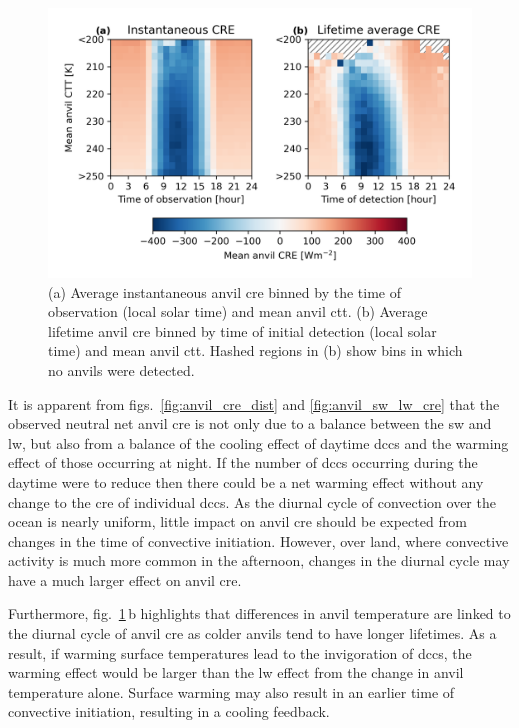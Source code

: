 \begin{figure}[tp]
    \includegraphics[width=\textwidth]{figures/chapter4_16.png}
    \caption[
    Average anvil \acrshort{cre} binned by the time of detection (local time) and mean anvil \acrshort{ctt}
    ]{
    (a) Average instantaneous anvil \acrshort{cre} binned by the time of observation (local solar time) and mean anvil \acrshort{ctt}. (b) Average lifetime anvil \acrshort{cre} binned by time of initial detection (local solar time) and mean anvil \acrshort{ctt}. Hashed regions in (b) show bins in which no anvils were detected.
    }
    \label{fig:anvil_cre_time_vs_ctt}
\end{figure}


It is apparent from figs.~\ref{fig:anvil_cre_dist} and \ref{fig:anvil_sw_lw_cre} that the observed neutral net anvil \acrshort{cre} is not only due to a balance between the \acrshort{sw} and \acrshort{lw}, but also from a balance of the cooling effect of daytime \acrshort{dcc}s and the warming effect of those occurring at night. 
If the number of \acrshort{dcc}s occurring during the daytime were to reduce then there could be a net warming effect without any change to the \acrshort{cre} of individual \acrshort{dcc}s.
As the diurnal cycle of convection over the ocean is nearly uniform, little impact on anvil \acrshort{cre} should be expected from changes in the time of convective initiation.
However, over land, where convective activity is much more common in the afternoon, changes in the diurnal cycle may have a much larger effect on anvil \acrshort{cre}.

Furthermore, fig.~\ref{fig:anvil_cre_time_vs_ctt}\,b highlights that differences in anvil temperature are linked to the diurnal cycle of anvil \acrshort{cre} as colder anvils tend to have longer lifetimes.
As a result, if warming surface temperatures lead to the invigoration of \acrshort{dcc}s, the warming effect would be larger than the \acrshort{lw} effect from the change in anvil temperature alone. 
Surface warming may also result in an earlier time of convective initiation, resulting in a cooling feedback.


